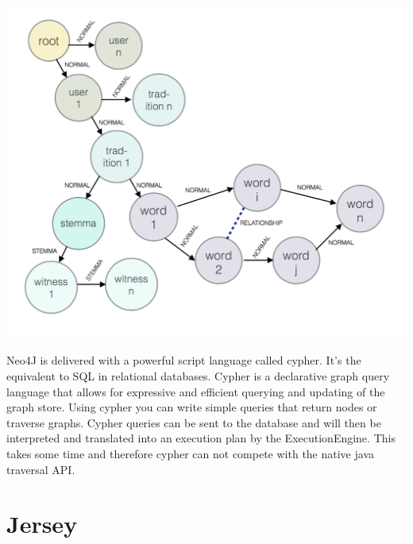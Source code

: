 \documentclass[11pt,fleqn,openany]{book} %
\begin{document}
\begin{center}
\includegraphics[scale=.5]{Pictures/database.png} 
\end{center} 
Neo4J is delivered with a powerful script language called cypher. It’s the equivalent to SQL in relational databases. Cypher is a declarative graph query language that allows for expressive and efficient querying and updating of the graph store. Using cypher you can write simple queries that return nodes or traverse graphs. Cypher queries can be sent to the database and will then be interpreted and translated into an execution plan by the ExecutionEngine. This takes some time and therefore cypher can not compete with the native java traversal API.



\chapter{Jersey}
\end{document}
